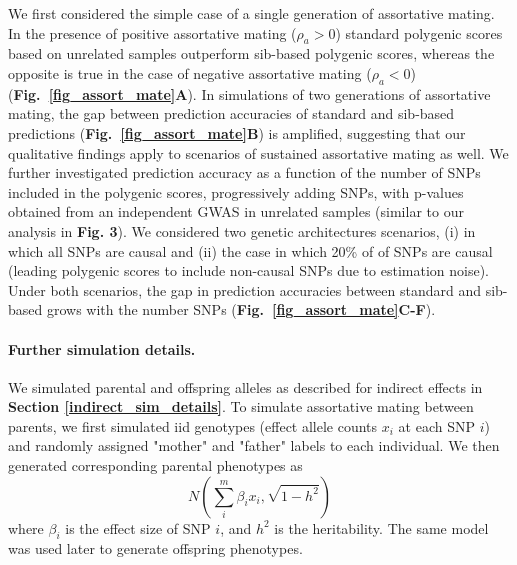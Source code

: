 \documentclass[hidelinks, 12pt]{article}
\begin{document}
We first considered the simple case of a single generation of assortative mating. In the presence of positive assortative mating ($\rho_a>0$) standard polygenic scores based on unrelated samples outperform sib-based polygenic scores, whereas the opposite is true in the case of negative assortative mating ($\rho_a<0$) ({\bf Fig.~\ref{fig_assort_mate}A}). In simulations of two generations of assortative mating, the gap between prediction accuracies of standard and sib-based predictions ({\bf Fig.~\ref{fig_assort_mate}B}) is amplified, suggesting that our qualitative findings apply to scenarios of sustained assortative mating as well. We further investigated prediction accuracy as a function of the number of SNPs included in the polygenic scores, progressively adding SNPs, with p-values obtained from an independent GWAS in unrelated samples (similar to our analysis in {\bf Fig. 3}). We considered two genetic architectures scenarios, (i) in which all SNPs are causal and (ii) the case in which 20\% of of SNPs are causal (leading polygenic scores to include non-causal SNPs due to estimation noise). Under both scenarios, the gap in prediction accuracies between standard and sib-based grows with the number SNPs ({\bf Fig.~\ref{fig_assort_mate}C-F}).\\

\paragraph{Further simulation details.}
\label{assortative_sim_details} 
We simulated parental and offspring alleles as described for indirect effects in {\bf Section \ref{indirect_sim_details}}. To simulate assortative mating between parents, we first simulated iid genotypes (effect allele counts $x_i$ at each SNP $i$) and randomly assigned "mother" and "father" labels to each individual. We then generated corresponding parental phenotypes as
$$N(\sum_i^m\beta_ix_i,\sqrt{1-h^2})$$ where  $\beta_i$ is the effect size of SNP $i$, and $h^2$ is the heritability.  The same model was used later to generate offspring phenotypes.
\end{document}
